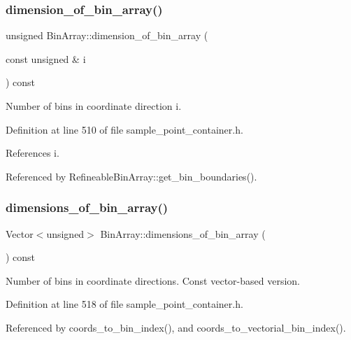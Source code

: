 \subsubsection{\texorpdfstring{dimension\+\_\+of\+\_\+bin\+\_\+array()}{dimension\_of\_bin\_array()}}
{\footnotesize\ttfamily unsigned Bin\+Array\+::dimension\+\_\+of\+\_\+bin\+\_\+array (\begin{DoxyParamCaption}\item[{const unsigned \&}]{i }\end{DoxyParamCaption}) const\hspace{0.3cm}{\ttfamily [inline]}}



Number of bins in coordinate direction i. 



Definition at line 510 of file sample\+\_\+point\+\_\+container.\+h.



References i.



Referenced by Refineable\+Bin\+Array\+::get\+\_\+bin\+\_\+boundaries().

\mbox{\label{classBinArray_a527596c024da9b9baf817778af18704a}} 
\subsubsection{\texorpdfstring{dimensions\+\_\+of\+\_\+bin\+\_\+array()}{dimensions\_of\_bin\_array()}\hspace{0.1cm}{\footnotesize\ttfamily [1/2]}}
{\footnotesize\ttfamily Vector$<$unsigned$>$ Bin\+Array\+::dimensions\+\_\+of\+\_\+bin\+\_\+array (\begin{DoxyParamCaption}{ }\end{DoxyParamCaption}) const\hspace{0.3cm}{\ttfamily [inline]}}



Number of bins in coordinate directions. Const vector-\/based version. 



Definition at line 518 of file sample\+\_\+point\+\_\+container.\+h.



Referenced by coords\+\_\+to\+\_\+bin\+\_\+index(), and coords\+\_\+to\+\_\+vectorial\+\_\+bin\+\_\+index().

